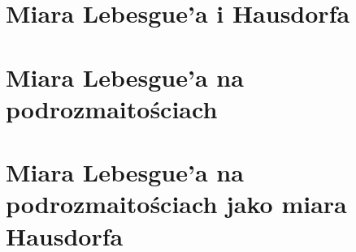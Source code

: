 \chapter{Miara Lebesgue'a i Hausdorfa}


\chapter{Miara Lebesgue'a na podrozmaitościach}


\chapter{Miara Lebesgue'a na podrozmaitościach jako miara Hausdorfa}
